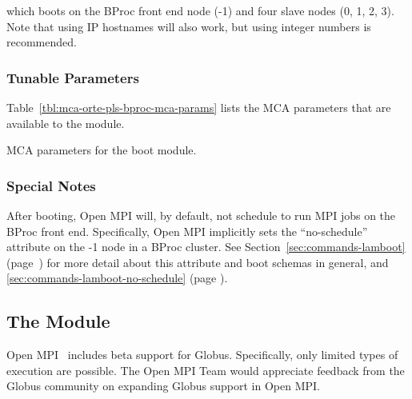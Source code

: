 \noindent which boots on the BProc front end node (-1) and four slave
nodes (0, 1, 2, 3).  Note that using IP hostnames will also work, but
using integer numbers is recommended.


\subsubsection{Tunable Parameters}

Table~\ref{tbl:mca-orte-pls-bproc-mca-params} lists the MCA parameters
that are available to the  module.

\begin{table}[htbp]
  \begin{ssiparamtb}
%
  \end{ssiparamtb}
  \caption{MCA parameters for the  boot module.}
  \label{tbl:mca-orte-pls-bproc-mca-params}
\end{table}


\subsubsection{Special Notes}

After booting, Open MPI will, by default, not schedule to run MPI jobs on
the BProc front end.  Specifically, Open MPI implicitly sets the
``no-schedule'' attribute on the -1 node in a BProc cluster.  See
Section~\ref{sec:commands-lamboot}
(page~\pageref{sec:commands-lamboot}) for more detail about this
attribute and boot schemas in general, and
\ref{sec:commands-lamboot-no-schedule} (page 
\pageref{sec:commands-lamboot-no-schedule}).


\subsection{The  Module}

Open MPI \ompiversion\ includes beta support for Globus.
Specifically, only limited types of execution are possible.  The Open
MPI Team would appreciate feedback from the Globus community on
expanding Globus support in Open MPI.

